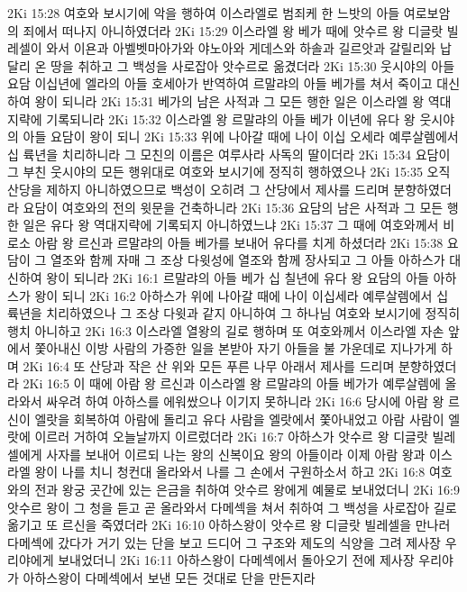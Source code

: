 2Ki 15:28  여호와 보시기에 악을 행하여 이스라엘로 범죄케 한 느밧의 아들 여로보암의 죄에서 떠나지 아니하였더라
2Ki 15:29  이스라엘 왕 베가 때에 앗수르 왕 디글랏 빌레셀이 와서 이욘과 아벨벳마아가와 야노아와 게데스와 하솔과 길르앗과 갈릴리와 납달리 온 땅을 취하고 그 백성을 사로잡아 앗수르로 옮겼더라
2Ki 15:30  웃시야의 아들 요담 이십년에 엘라의 아들 호세아가 반역하여 르말랴의 아들 베가를 쳐서 죽이고 대신하여 왕이 되니라
2Ki 15:31  베가의 남은 사적과 그 모든 행한 일은 이스라엘 왕 역대지략에 기록되니라
2Ki 15:32  이스라엘 왕 르말랴의 아들 베가 이년에 유다 왕 웃시야의 아들 요담이 왕이 되니
2Ki 15:33  위에 나아갈 때에 나이 이십 오세라 예루살렘에서 십 륙년을 치리하니라 그 모친의 이름은 여루사라 사독의 딸이더라
2Ki 15:34  요담이 그 부친 웃시야의 모든 행위대로 여호와 보시기에 정직히 행하였으나
2Ki 15:35  오직 산당을 제하지 아니하였으므로 백성이 오히려 그 산당에서 제사를 드리며 분향하였더라 요담이 여호와의 전의 윗문을 건축하니라
2Ki 15:36  요담의 남은 사적과 그 모든 행한 일은 유다 왕 역대지략에 기록되지 아니하였느냐
2Ki 15:37  그 때에 여호와께서 비로소 아람 왕 르신과 르말랴의 아들 베가를 보내어 유다를 치게 하셨더라
2Ki 15:38  요담이 그 열조와 함께 자매 그 조상 다윗성에 열조와 함께 장사되고 그 아들 아하스가 대신하여 왕이 되니라
2Ki 16:1  르말랴의 아들 베가 십 칠년에 유다 왕 요담의 아들 아하스가 왕이 되니
2Ki 16:2  아하스가 위에 나아갈 때에 나이 이십세라 예루살렘에서 십 륙년을 치리하였으나 그 조상 다윗과 같지 아니하여 그 하나님 여호와 보시기에 정직히 행치 아니하고
2Ki 16:3  이스라엘 열왕의 길로 행하며 또 여호와께서 이스라엘 자손 앞에서 쫓아내신 이방 사람의 가증한 일을 본받아 자기 아들을 불 가운데로 지나가게 하며
2Ki 16:4  또 산당과 작은 산 위와 모든 푸른 나무 아래서 제사를 드리며 분향하였더라
2Ki 16:5  이 때에 아람 왕 르신과 이스라엘 왕 르말랴의 아들 베가가 예루살렘에 올라와서 싸우려 하여 아하스를 에워쌌으나 이기지 못하니라
2Ki 16:6  당시에 아람 왕 르신이 엘랏을 회복하여 아람에 돌리고 유다 사람을 엘랏에서 쫓아내었고 아람 사람이 엘랏에 이르러 거하여 오늘날까지 이르렀더라
2Ki 16:7  아하스가 앗수르 왕 디글랏 빌레셀에게 사자를 보내어 이르되 나는 왕의 신복이요 왕의 아들이라 이제 아람 왕과 이스라엘 왕이 나를 치니 청컨대 올라와서 나를 그 손에서 구원하소서 하고
2Ki 16:8  여호와의 전과 왕궁 곳간에 있는 은금을 취하여 앗수르 왕에게 예물로 보내었더니
2Ki 16:9  앗수르 왕이 그 청을 듣고 곧 올라와서 다메섹을 쳐서 취하여 그 백성을 사로잡아 길로 옮기고 또 르신을 죽였더라
2Ki 16:10  아하스왕이 앗수르 왕 디글랏 빌레셀을 만나러 다메섹에 갔다가 거기 있는 단을 보고 드디어 그 구조와 제도의 식양을 그려 제사장 우리야에게 보내었더니
2Ki 16:11  아하스왕이 다메섹에서 돌아오기 전에 제사장 우리야가 아하스왕이 다메섹에서 보낸 모든 것대로 단을 만든지라
